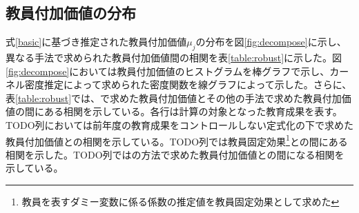 \documentclass[a4paper,12pt]{article}
\begin{document}
\subsection{教員付加価値の分布\label{estimation}}
式\ref{basic}に基づき推定された教員付加価値$\mu_j$の分布を図\ref{fig:decompose}に示し、異なる手法で求められた教員付加価値間の相関を表\ref{table:robust}に示した。図\ref{fig:decompose}においては教員付加価値のヒストグラムを棒グラフで示し、カーネル密度推定によって求められた密度関数を線グラフによって示した。さらに、表\ref{table:robust}では、\cite{kane2008estimating}で求めた教員付加価値とその他の手法で求めた教員付加価値の間にある相関を示している。各行は計算の対象となった教育成果を表す。TODO列においては前年度の教育成果をコントロールしない定式化の下で求めた教員付加価値との相関を示している。TODO列では教員固定効果\footnote{教員を表すダミー変数に係る係数の推定値を教員固定効果として求めた}との間にある相関を示した。TODO列では\cite{chetty2014measuring}の方法で求めた教員付加価値との間になる相関を示している。


\end{document}
